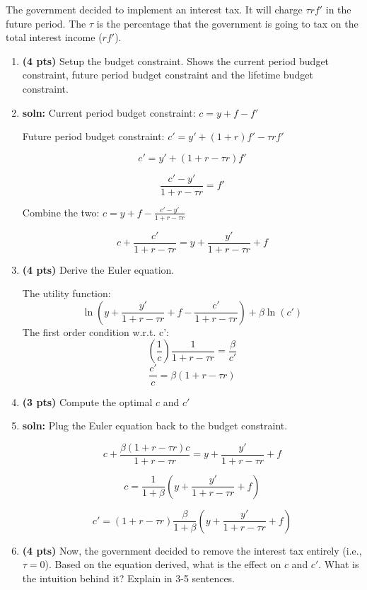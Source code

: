 \documentclass[14pt, oneside]{memoir}
\begin{document}
\begin{enumerate}[label=\textbf{\arabic*.}, itemsep=15pt]
The government decided to implement an interest tax. It will charge $\tau r f'$ in the future period. The $\tau$ is the percentage that the government is going to tax on the total interest income ($r f'$).




\begin{enumerate}[label=(\alph*)]
	\item \textbf{(4 pts)} 	Setup the budget constraint. Shows the current period budget constraint, future period budget constraint and the lifetime budget constraint.
	
	\vspace{1cm}
	\item[] \textbf{soln:} Current period budget constraint: $c = y +f - f'$
	
	Future period budget constraint: $c' = y' +(1+r)f' - \tau r f'$
	
	\[c' = y' + (1+r-\tau r)f'\]
	
	\[\frac{c' -y'}{1+r-\tau r}=  f'\]
	
	Combine the two: $c = y +f - \frac{c' -y'}{1+r-\tau r}$
	
	\[c + \frac{c'}{1+r-\tau r} = y + \frac{y'}{1+r-\tau r} +f \]
	\clearpage
	\item \textbf{(4 pts)}  Derive the Euler equation. 
	
	\vspace{1cm}
	The utility function:
	\[\ln\left(y + \frac{y'}{1+r-\tau r} +f - \frac{c'}{1+r-\tau r} \right) + \beta\ln(c')\]
	The first order condition w.r.t. c':
	\[\left(\frac{1}{c}\right) \frac{1}{1+r-\tau r} = \frac{\beta}{c'}\]
	\[\frac{c'}{c} = \beta \left(1+r-\tau r\right)\]
	
	\clearpage
	\item \textbf{(3 pts)}  Compute the optimal $c$ and $c'$
	\vspace{1cm}
	
	\item[] \textbf{soln:} Plug the Euler equation back to the budget constraint.
	
	\[c + \frac{\beta \left(1+r-\tau r\right)c}{1+r-\tau r} = y + \frac{y'}{1+r-\tau r} +f \]
	
	\[c = \frac{1}{1+\beta}\left(y + \frac{y'}{1+r-\tau r} +f\right)\]
	
	\[c' =  \left(1+r-\tau r\right) \frac{\beta}{1+\beta}\left(y + \frac{y'}{1+r-\tau r} +f\right)\]
	
	\vspace{1cm}
	\item \textbf{(4 pts)}  Now, the government decided to remove the interest tax entirely (i.e., $\tau = 0$). Based on the equation derived, what is the effect on $c$ and $c'$. What is the intuition behind it? Explain in 3-5 sentences.
	

\end{enumerate}
\end{enumerate}
\end{document}
